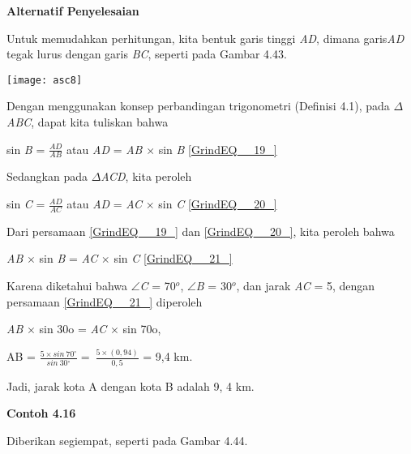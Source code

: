 \documentclass[11pt,fleqn]{book} %
\begin{document}
\begin{myEnumerate}
\begin{itemize}
\noindent \textbf{}

\noindent \textbf{Alternatif Penyelesaian}

\noindent Untuk memudahkan perhitungan, kita bentuk garis tinggi \textit{AD}, dimana garis\textit{AD }tegak lurus dengan garis \textit{BC}, seperti pada Gambar 4.43.

\noindent 

\texttt{[image: asc8]}

\noindent 

\noindent Dengan menggunakan konsep perbandingan trigonometri (Definisi 4.1), pada $\Delta$\textit{ABC}, dapat kita tuliskan bahwa

\noindent 

\noindent sin \textit{B }=  $\frac{AD}{AB}$ atau \textit{AD }= \textit{AB }$\times$ sin \textit{B        }\eqref{GrindEQ__19_}\eject \textit{}

\noindent Sedangkan pada $\Delta$\textit{ACD}, kita peroleh

\noindent 

\noindent sin \textit{C }= $\frac{AD}{AC}$ atau \textit{AD }= \textit{AC }$\times$ sin \textit{C        }\eqref{GrindEQ__20_}\textit{}

\noindent 

\noindent Dari persamaan \eqref{GrindEQ__19_} dan \eqref{GrindEQ__20_}, kita peroleh bahwa

\noindent \textit{}

\noindent \textit{AB }$\times$ sin \textit{B }= \textit{AC }$\times$ sin \textit{C         }\eqref{GrindEQ__21_}

\noindent 

\noindent Karena diketahui bahwa $\mathrm{\angle }$\textit{C }= 70${}^{o}$, $\mathrm{\angle }$\textit{B }= 30${}^{o}$, dan jarak \textit{AC }= 5, dengan persamaan \eqref{GrindEQ__21_} diperoleh

\noindent \textit{}

\noindent \textit{AB }$\times$ sin 30o = \textit{AC }$\times$ sin 70o,

\noindent AB = $\frac{5\times sin\ 70{}^\circ }{sin\ 30{}^\circ }=\ \frac{5\times (0,94)}{0,5}$ = 9,4 km.

\noindent 

\noindent Jadi, jarak kota A dengan kota B adalah 9, 4 km.

\noindent 

\noindent \textbf{Contoh 4.16}

\noindent Diberikan segiempat, seperti pada Gambar 4.44.


\end{itemize}
\end{myEnumerate}
\end{document}
